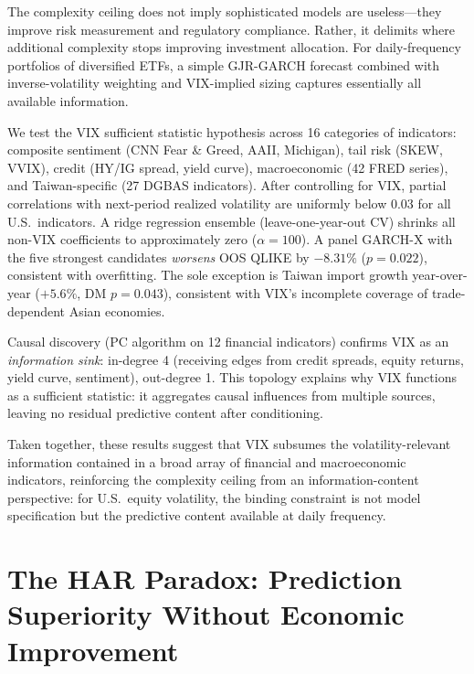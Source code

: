 The complexity ceiling does not imply sophisticated models are useless---they improve risk measurement and regulatory compliance. Rather, it delimits where additional complexity stops improving investment allocation. For daily-frequency portfolios of diversified ETFs, a simple GJR-GARCH forecast combined with inverse-volatility weighting and VIX-implied sizing captures essentially all available information.

We test the VIX sufficient statistic hypothesis across 16 categories of indicators: composite sentiment (CNN Fear \& Greed, AAII, Michigan), tail risk (SKEW, VVIX), credit (HY/IG spread, yield curve), macroeconomic (42 FRED series), and Taiwan-specific (27 DGBAS indicators). After controlling for VIX, partial correlations with next-period realized volatility are uniformly below 0.03 for all U.S.\ indicators. A ridge regression ensemble (leave-one-year-out CV) shrinks all non-VIX coefficients to approximately zero ($\alpha = 100$). A panel GARCH-X with the five strongest candidates \textit{worsens} OOS QLIKE by $-8.31\%$ ($p = 0.022$), consistent with overfitting. The sole exception is Taiwan import growth year-over-year ($+5.6\%$, DM $p = 0.043$), consistent with VIX's incomplete coverage of trade-dependent Asian economies.

Causal discovery (PC algorithm on 12 financial indicators) confirms VIX as an \textit{information sink}: in-degree 4 (receiving edges from credit spreads, equity returns, yield curve, sentiment), out-degree 1. This topology explains why VIX functions as a sufficient statistic: it aggregates causal influences from multiple sources, leaving no residual predictive content after conditioning.

Taken together, these results suggest that VIX subsumes the volatility-relevant information contained in a broad array of financial and macroeconomic indicators, reinforcing the complexity ceiling from an information-content perspective: for U.S.\ equity volatility, the binding constraint is not model specification but the predictive content available at daily frequency.

\section{The HAR Paradox: Prediction Superiority Without Economic Improvement}
\label{sec:har_paradox}

